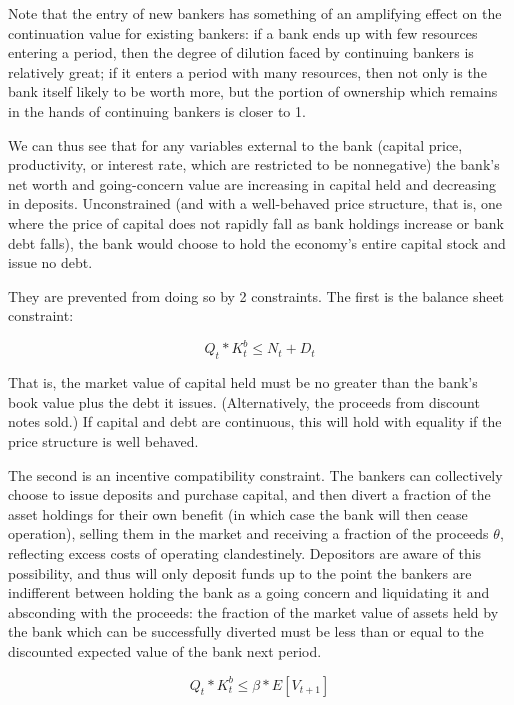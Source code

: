 \documentclass[english]{article}
\begin{document}
Note that the entry of new bankers has something of an amplifying effect on the continuation value 
for existing bankers: if a bank ends up with few resources entering a period, then the degree of 
dilution faced by continuing bankers is relatively great; if it enters a period with many resources, 
then not only is the bank itself likely to be worth more, but the portion of ownership which remains 
in the hands of continuing bankers is closer to 1.

We can thus see that for any variables external to the bank (capital price, productivity, or interest rate, 
which are restricted to be nonnegative) the bank's net worth and going-concern value are increasing 
in capital held and decreasing in deposits. Unconstrained (and with a well-behaved price structure, 
that is, one where the price of capital does not rapidly fall as bank holdings increase or bank debt 
falls), the bank would choose to hold the economy's entire capital stock and issue no debt.

They are prevented from doing so by 2 constraints. The first is the balance sheet constraint:

\begin{equation}Q_{t}*K^b_t \leq N_t + D_t \end{equation}

That is, the market value of capital held must be no greater than the bank's book value plus the debt 
it issues. (Alternatively, the proceeds from discount notes sold.) If capital and debt are continuous, 
this will hold with equality if the price structure is well behaved.

The second is an incentive compatibility constraint. The bankers can collectively choose to issue 
deposits and purchase capital, and then divert a fraction of the asset holdings for their own benefit 
(in which case the bank will then cease operation), 
selling them in the market and receiving a fraction of the proceeds $\theta$, reflecting excess  
costs of operating clandestinely. Depositors are aware of this possibility, and thus will only deposit 
funds up to the point the bankers are indifferent between holding the bank as a going concern and 
liquidating it and absconding with the proceeds: the fraction of the market value of assets held by 
the bank which can be successfully diverted must be less than or equal to the discounted expected 
value of the bank next period.

\begin{equation}Q_{t}*K^b_t \leq \beta*E\left[V_{t+1}\right] \end{equation}
\end{document}
